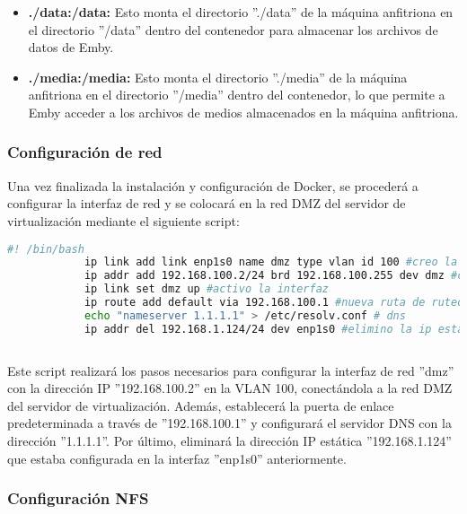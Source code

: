 \begin{itemize}
\begin{itemize}
			\item \textbf{./data:/data:} Esto monta el directorio ''./data'' de la máquina anfitriona en el directorio ''/data'' dentro del contenedor para almacenar los archivos de datos de Emby.
		
			\item \textbf{./media:/media:} Esto monta el directorio ''./media'' de la máquina anfitriona en el directorio ''/media'' dentro del contenedor, lo que permite a Emby acceder a los archivos de medios almacenados en la máquina anfitriona.
	
		\end{itemize}
	
	\end{itemize}

			\subsubsection{Configuración de red}
			
			Una vez finalizada la instalación y configuración de Docker, se procederá a configurar la interfaz de red y se colocará en la red DMZ del servidor de virtualización mediante el siguiente script:
			
			\begin{lstlisting}[language=Bash, caption=docker]
			#! /bin/bash
			ip link add link enp1s0 name dmz type vlan id 100 #creo la vlan
			ip addr add 192.168.100.2/24 brd 192.168.100.255 dev dmz #configuro la ip
			ip link set dmz up #activo la interfaz
			ip route add default via 192.168.100.1 #nueva ruta de ruteo
			echo "nameserver 1.1.1.1" > /etc/resolv.conf # dns
			ip addr del 192.168.1.124/24 dev enp1s0 #elimino la ip estatica anterio
			
			\end{lstlisting}
		
			Este script realizará los pasos necesarios para configurar la interfaz de red ''dmz'' con la dirección IP ''192.168.100.2'' en la VLAN 100, conectándola a la red DMZ del servidor de virtualización. Además, establecerá la puerta de enlace predeterminada a través de ''192.168.100.1'' y configurará el servidor DNS con la dirección ''1.1.1.1''. Por último, eliminará la dirección IP estática ''192.168.1.124'' que estaba configurada en la interfaz ''enp1s0'' anteriormente.
			
			\subsubsection{Configuración NFS}
			
